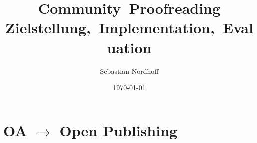 \documentclass[handout]{beamer}
\date{\today}
\title{\mbox{Community Proofreading}\\
\mbox{\large Zielstellung, Implementation, Evaluation}}
\institute{Language Science Press}
\author[LangSci]{Sebastian Nordhoff}
\begin{document}
\lspbeamertitle

\section{OA $\to$ Open Publishing}

\end{document}
